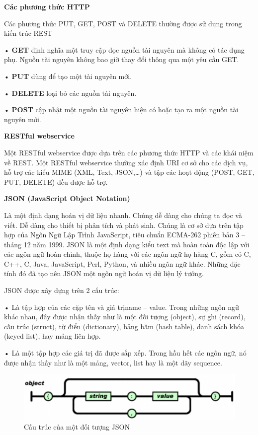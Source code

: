 \textbf{Các phương thức HTTP}

Các phương thức PUT, GET, POST và DELETE thường được sử dụng trong kiến trúc REST

• \textbf{GET} định nghĩa một truy cập đọc nguồn tài nguyên mà không có tác dụng phụ. Nguồn tài nguyên không bao giờ thay đổi thông qua một yêu cầu GET.

• \textbf{PUT} dùng để tạo một tài nguyên mới.

• \textbf{DELETE} loại bỏ các nguồn tài nguyên.

• \textbf{POST} cập nhật một nguồn tài nguyên hiện có hoặc tạo ra một nguồn tài nguyên mới.

\textbf{RESTful webservice}

Một RESTful webservice được dựa trên các phương thức HTTP và các khái niệm về REST. Một RESTful webservice thường xác định URI cơ sở cho các dịch vụ, hỗ trợ các kiểu MIME (XML, Text, JSON,…) và tập các hoạt động (POST, GET, PUT, DELETE) đều được hỗ trợ.

\textbf{JSON (JavaScript Object Notation)}

Là một định dạng hoán vị dữ liệu nhanh. Chúng dễ dàng cho chúng ta đọc và viết. Dễ dàng cho thiết bị phân tích và phát sinh. Chúng là cơ sở dựa trên tập hợp của Ngôn Ngữ Lập Trình JavaScript, tiêu chuẩn ECMA-262 phiên bản 3 – tháng 12 năm 1999. JSON là một định dạng kiểu text mà hoàn toàn độc lập với các ngôn ngữ hoàn chỉnh, thuộc họ hàng với các ngôn ngữ họ hàng C, gồm có C, C++, C, Java, JavaScript, Perl, Python, và nhiều ngôn ngữ khác. Những đặc tính đó đã tạo nên JSON một ngôn ngữ hoán vị dữ liệu lý tưởng.

JSON được xây dựng trên 2 cấu trúc:

• Là tập hợp của các cặp tên và giá trịname – value. Trong những ngôn ngữ khác nhau, đây được nhận thấy như là một đối tượng (object), sự ghi (record), cấu trúc (struct), từ điển (dictionary), bảng băm (hash table), danh sách khóa (keyed list), hay mảng liên hợp.

• Là một tập hợp các giá trị đã được sắp xếp. Trong hầu hết các ngôn ngữ, nó được nhận thấy như là một mảng, vector, list hay là một dãy sequence.


\begin{figure}[H]
	\centering    
	\includegraphics[width=1.0\textwidth]{json0}
	\caption[Cấu trúc của một đối tượng JSON]{Cấu trúc của một đối tượng JSON}
	\label{fig: json0}
\end{figure}

